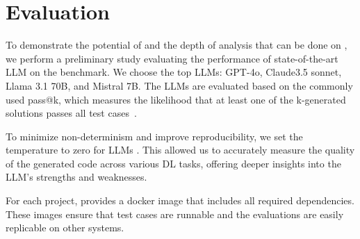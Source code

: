 \section{Evaluation}

To demonstrate the potential of \tool and the depth of analysis that can be done on \tool, we perform a preliminary study evaluating the performance of state-of-the-art LLM on the \tool benchmark. We choose the top LLMs: 
GPT-4o, 
Claude3.5 sonnet, 
Llama 3.1 70B, and 
Mistral 7B.
The LLMs are evaluated based on the commonly used pass@k, which measures the likelihood that at least one of the k-generated solutions passes all test cases~\cite{lyu2024top}. 


To minimize non-determinism and improve reproducibility, we set the temperature to zero for LLMs \cite{bommasani2021opportunities}. This allowed us to accurately measure the %
quality of the generated code across various DL tasks, offering deeper insights into the LLM's strengths and weaknesses.

For each project, \tool provides 
a
docker image that includes all required dependencies.
These images
ensure that test cases are runnable and the evaluations are
easily replicable on other systems.


